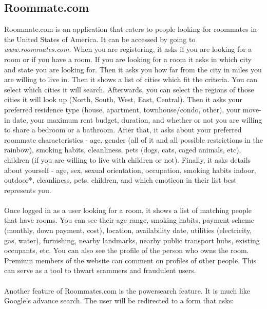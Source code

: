 \documentclass[11pt, draft, journal]{./IEEE/IEEEtran}
\begin{document}
\subsection{Roommate.com}
Roommate.com is an application that caters to people looking for roommates in the United States of America. It can be accessed by going to \textit{www.roommates.com}. When you are registering, it asks if you are looking for a room or if you have a room. If you are looking for a room it asks in which city and state you are looking for. Then it asks you how far from the city in miles you are willing to live in. Then it shows a list of cities which fit the criteria. You can select which cities it will search. Afterwards, you can select the regions of those cities it will look up (North, South, West, East, Central). Then it asks your preferred residence type (house, apartment, townhouse/condo, other), your move-in date, your maximum rent budget, duration, and whether or not you are willing to share a bedroom or a bathroom. After that, it asks about your preferred roommate characteristics - age, gender (all of it and all possible restrictions in the rainbow), smoking habits, cleanliness, pets (dogs, cats, caged animals, etc), children (if you are willing to live with children or not). Finally, it asks details about yourself -  age, sex, sexual orientation, occupation, smoking habits {indoor, outdoor}*, cleanliness, pets, children, and which emoticon in their list best represents you.
\\
\\
\indent Once logged in as a user looking for a room, it shows a list of matching people that have rooms. You can see their age range, smoking habits, payment scheme (monthly, down payment, cost), location, availability date, utilities (electricity, gas, water), furnishing, nearby landmarks, nearby public transport hubs, existing occupants, etc. You can also see the profile of the person who owns the room. Premium members of the website can comment on profiles of other people. This can serve as a tool to thwart scammers and fraudulent users.
\\
\\
\indent Another feature of Roommates.com is the powersearch feature. It is much like Google's advance search. The user will be redirected to a form that asks:
\end{document}
